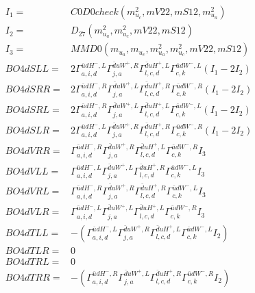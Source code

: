 \documentclass[A4,landscape]{article}
\begin{document}
\begin{align} 
I_1 = & C0D0check(m^2_{u_{{c}}}, mV22, mS12, m^2_{u_{{a}}}) \\ 
I_2 = & D_{27}(m^2_{u_{{a}}}, m^2_{u_{{c}}}, mV22, mS12) \\ 
I_3 = & MMD0(m_{u_{{a}}}, m_{u_{{c}}}, m^2_{u_{{a}}}, m^2_{u_{{c}}}, mV22, mS12) \\ 
  BO4dSLL= & 2  \Gamma^{\bar{u}d H^- ,L}_{a, i, d} \Gamma^{\bar{d}u W^+ ,R}_{j, a} \Gamma^{\bar{d}u H^+,L}_{l, c, d} \Gamma^{\bar{u}d W^-,L}_{c, k} (I_1 - 2 I_2) \\ 
  BO4dSRR= & 2  \Gamma^{\bar{u}d H^- ,R}_{a, i, d} \Gamma^{\bar{d}u W^+ ,L}_{j, a} \Gamma^{\bar{d}u H^+,R}_{l, c, d} \Gamma^{\bar{u}d W^-,R}_{c, k} (I_1 - 2 I_2) \\ 
  BO4dSRL= & 2  \Gamma^{\bar{u}d H^- ,R}_{a, i, d} \Gamma^{\bar{d}u W^+ ,L}_{j, a} \Gamma^{\bar{d}u H^+,L}_{l, c, d} \Gamma^{\bar{u}d W^-,L}_{c, k} (I_1 - 2 I_2) \\ 
  BO4dSLR= & 2  \Gamma^{\bar{u}d H^- ,L}_{a, i, d} \Gamma^{\bar{d}u W^+ ,R}_{j, a} \Gamma^{\bar{d}u H^+,R}_{l, c, d} \Gamma^{\bar{u}d W^-,R}_{c, k} (I_1 - 2 I_2) \\ 
  BO4dVRR= &  \Gamma^{\bar{u}d H^- ,R}_{a, i, d} \Gamma^{\bar{d}u W^+ ,R}_{j, a} \Gamma^{\bar{d}u H^+,L}_{l, c, d} \Gamma^{\bar{u}d W^-,R}_{c, k} I_3 \\ 
  BO4dVLL= &  \Gamma^{\bar{u}d H^- ,L}_{a, i, d} \Gamma^{\bar{d}u W^+ ,L}_{j, a} \Gamma^{\bar{d}u H^+,R}_{l, c, d} \Gamma^{\bar{u}d W^-,L}_{c, k} I_3 \\ 
  BO4dVRL= &  \Gamma^{\bar{u}d H^- ,R}_{a, i, d} \Gamma^{\bar{d}u W^+ ,R}_{j, a} \Gamma^{\bar{d}u H^+,R}_{l, c, d} \Gamma^{\bar{u}d W^-,L}_{c, k} I_3 \\ 
  BO4dVLR= &  \Gamma^{\bar{u}d H^- ,L}_{a, i, d} \Gamma^{\bar{d}u W^+ ,L}_{j, a} \Gamma^{\bar{d}u H^+,L}_{l, c, d} \Gamma^{\bar{u}d W^-,R}_{c, k} I_3 \\ 
  BO4dTLL= & -( \Gamma^{\bar{u}d H^- ,L}_{a, i, d} \Gamma^{\bar{d}u W^+ ,R}_{j, a} \Gamma^{\bar{d}u H^+,L}_{l, c, d} \Gamma^{\bar{u}d W^-,L}_{c, k} I_2) \\ 
  BO4dTLR= & 0 \\ 
  BO4dTRL= & 0 \\ 
  BO4dTRR= & -( \Gamma^{\bar{u}d H^- ,R}_{a, i, d} \Gamma^{\bar{d}u W^+ ,L}_{j, a} \Gamma^{\bar{d}u H^+,R}_{l, c, d} \Gamma^{\bar{u}d W^-,R}_{c, k} I_2) \\ 
\end{align} 
\end{document}
